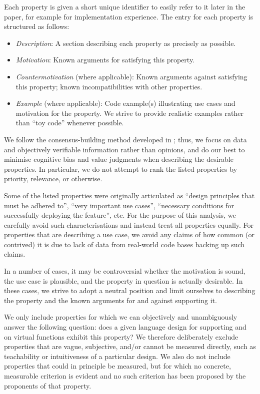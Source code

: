 Each property is given a short unique identifier to easily refer to it later in the paper, for example  for implementation experience. The entry for each property is structured as follows:
\begin{itemize}
\item \emph{Description}: A section describing each property as precisely as possible.
\item \emph{Motivation}: Known arguments for satisfying this property.
\item \emph{Countermotivation} (where applicable): Known arguments against satisfying this property; known incompatibilities with other properties.
\item \emph{Example} (where applicable): Code example(s) illustrating use cases and motivation for the property. We strive to provide realistic examples rather than ``toy code'' whenever possible. 
\end{itemize}
We follow the consensus-building method developed in \cite{P3099R0}; thus, we focus on data and objectively verifiable information rather than opinions, and do our best to minimise cognitive bias and value judgments when describing the desirable properties. In particular, we do not attempt to rank the listed properties by priority, relevance, or otherwise. 

Some of the listed properties were originally articulated as ``design principles that must be adhered to'',  ``very important use cases'', ``necessary conditions for successfully deploying the feature'', etc. For the purpose of this analysis, we carefully avoid such characterisations and instead treat all properties equally. For properties that are describing a use case, we avoid any claims of how common (or contrived) it is due to lack of data from real-world code bases backing up such claims.

In a number of cases, it may be controversial whether the motivation is sound, the use case is plausible, and the property in question is actually desirable. In these cases, we strive to adopt a neutral position and limit ourselves to describing the property and the known arguments for and against supporting it.

We only include properties for which we can objectively and unambiguously answer the following question: does a given language design for supporting  and  on virtual functions exhibit this property? We therefore deliberately exclude properties that are vague, subjective, and/or cannot be measured directly, such as teachability or intuitiveness of a particular design. We also do not include properties that could in principle be measured, but for which no concrete, measurable criterion is evident and no such criterion has been proposed by the proponents of that property.

